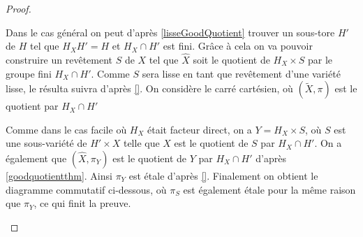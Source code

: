 \begin{proof}
	\begin{center}
	\end{center}

Dans le cas général on peut d'après \ref{lisseGoodQuotient} trouver un sous-tore $H'$ de $H$ tel que $H_XH'=H$ et $H_X\cap H'$ est fini. Grâce à cela on va pouvoir construire un revêtement $S$ de $X$ tel que $\widehat{X}$ soit le quotient de $H_X\times S$ par le groupe fini $H_X\cap H'$. Comme $S$ sera lisse en tant que revêtement d'une variété lisse, le résulta suivra d'après \ref{}. On considère le carré cartésien, où $(\widetilde{X},\pi)$ est le quotient par $H_X\cap H'$

	\begin{center}
	\end{center}

Comme dans le cas facile où $H_X$ était facteur direct, on a $Y=H_X\times S$, où $S$ est une sous-variété de $H'\times X$ telle que $X$ est le quotient de $S$ par $H_X\cap H'$. On a également que $(\widehat{X}, \pi_Y)$ est le quotient de $Y$ par $H_X\cap H'$ d'après \ref{goodquotientthm}. Ainsi $\pi_Y$ est étale d'après \ref{}. Finalement on obtient le diagramme commutatif ci-dessous, où $\pi_S$ est également étale pour la même raison que $\pi_Y$, ce qui finit la preuve.

	\begin{center}
	\end{center}


\end{proof}

